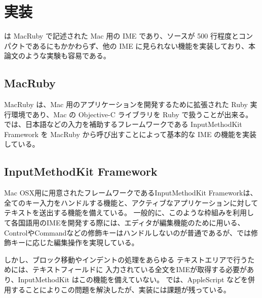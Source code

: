 \section{実装}
{\system} は MacRuby で記述された Mac 用の IME であり、ソースが 500 行程度とコンパクトであるにもかかわらず、他の IME に見られない機能を実装しており、本論文のような実験も容易である。

\subsection{MacRuby}
MacRuby は、Mac 用のアプリケーションを開発するために拡張された Ruby 実行環境であり、Mac の Objective-C ライブラリを Ruby で扱うことが出来る。
{\system} では、日本語などの入力を補助するフレームワークである InputMethodKit Framework を MacRuby から呼び出すことによって基本的な IME の機能を実装している。

\subsection{InputMethodKit Framework}
Mac OSX用に用意されたフレームワークであるInputMethodKit Frameworkは、全てのキー入力をハンドルする機能と、アクティブなアプリケーションに対してテキストを送出する機能を備えている。
一般的に、このような枠組みを利用して各国語用のIMEを開発する際には、エディタが編集機能のために用いる、ControlやCommandなどの修飾キーはハンドルしないのが普通であるが、{\system}では修飾キーに応じた編集操作を実現している。

しかし、ブロック移動やインデントの処理をあらゆる テキストエリアで行うためには、テキストフィールドに 入力されている全文をIMEが取得する必要があり、InputMethodKit はこの機能を備えていない。{\system} では、AppleScript などを併用することによりこの問題を解決したが、実装には課題が残っている。
